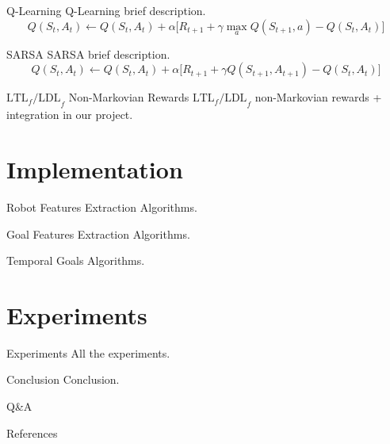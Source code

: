 \documentclass{beamer}
\begin{document}
    \begin{frame}{Q-Learning}
        Q-Learning brief description.
        \begin{equation*}
            Q(S_t, A_t) \leftarrow Q(S_t, A_t) + \alpha \Big[ R_{t+1} +
                \gamma \max_{a} Q(S_{t+1}, a) - Q(S_t, A_t) \Big]
        \end{equation*}
    \end{frame}

    \begin{frame}{SARSA}
        SARSA brief description.
        \begin{equation*}
            Q(S_t, A_t) \leftarrow Q(S_t, A_t) + \alpha \Big[ R_{t+1} +
                \gamma Q(S_{t+1}, A_{t+1}) - Q(S_t, A_t) \Big]
        \end{equation*}
    \end{frame}

    \begin{frame}{$\text{LTL}_f\text{/LDL}_f$ Non-Markovian Rewards}
        $\text{LTL}_f\text{/LDL}_f$ non-Markovian rewards + integration
        in our project.
    \end{frame}

    \section{Implementation}

    \begin{frame}{Robot Features Extraction}
        Algorithms.
    \end{frame}

    \begin{frame}{Goal Features Extraction}
        Algorithms.
    \end{frame}

    \begin{frame}{Temporal Goals}
        Algorithms.
    \end{frame}

    \section{Experiments}

    \begin{frame}{Experiments}
        All the experiments.
    \end{frame}

    \begin{frame}{Conclusion}
        Conclusion.
    \end{frame}

    \begin{frame}[standout]
        Q\&A
    \end{frame}

    \appendix

    \begin{frame}[allowframebreaks]{References}
        
        
    \end{frame}
\end{document}
